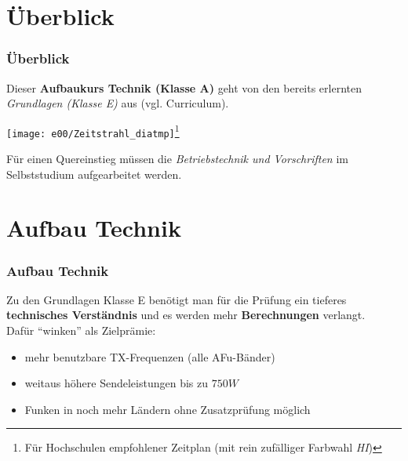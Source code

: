 

\subtitle{Technik Klasse A 00: \\
          Curriculum \& Organisatorisches \\[2em]}
\date{Stand 04.02.2016}



\section{Überblick}

\begin{frame}
    \frametitle{Überblick}

    Dieser \textbf{Aufbaukurs Technik (Klasse A)} geht von den bereits erlernten
    \emph{Grundlagen (Klasse E)} aus (vgl. Curriculum\hyperlink{refs}{\cite{curr}}).

    \vspace{2em}

    \texttt{[image: e00/Zeitstrahl\_diatmp]}\footnote{Für
    Hochschulen empfohlener Zeitplan \tiny (mit rein zufälliger Farbwahl \emph{HI})}

    \vspace{1em}

    Für einen Quereinstieg müssen die \emph{Betriebstechnik und Vorschriften} im
    Selbststudium aufgearbeitet werden.

\end{frame}

\section{Aufbau Technik}

\begin{frame}
    \frametitle{Aufbau Technik}
    
    Zu den Grundlagen Klasse E benötigt man für die Prüfung ein tieferes
    \textbf{technisches Verständnis} und es werden mehr \textbf{Berechnungen}
    verlangt. \\[2em]

    Dafür ``winken'' als Zielprämie:

    \begin{itemize}
        \item mehr benutzbare TX-Frequenzen (alle AFu-Bänder)
        \item weitaus höhere Sendeleistungen bis zu $750W$
        \item Funken in noch mehr Ländern ohne Zusatzprüfung möglich
    \end{itemize}

\end{frame}

